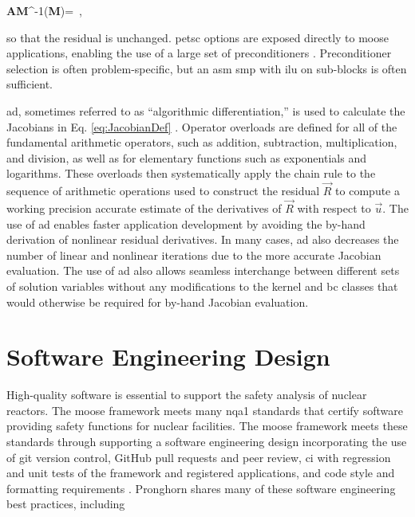 \beq
\textbf{A}\textbf{M}^{-1}(\textbf{M})=\ ,
\eeq

\noindent so that the residual is unchanged. \gls{petsc} options are exposed directly to \gls{moose} applications, enabling the use of a large set of preconditioners \cite{petsc}. Preconditioner selection is often problem-specific, but an \gls{asm} \gls{smp} with \gls{ilu} on sub-blocks is often sufficient.

\gls{ad}, sometimes referred to as ``algorithmic differentiation,'' is used to calculate the Jacobians in Eq. \eqref{eq:JacobianDef} \cite{ad}. Operator overloads are defined for all of the fundamental arithmetic operators, such as addition, subtraction, multiplication, and division, as well as for elementary functions such as exponentials and logarithms. These overloads then systematically apply the chain rule to the sequence of arithmetic operations used to construct the residual \(\vec{R}\) to compute a working precision accurate estimate of the derivatives of \(\vec{R}\) with respect to \(\vec{u}\). The use of \gls{ad} enables faster application development by avoiding the by-hand derivation of nonlinear residual derivatives. In many cases, \gls{ad} also decreases the number of linear and nonlinear iterations due to the more accurate Jacobian evaluation. The use of \gls{ad} also allows seamless interchange between different sets of solution variables without any modifications to the kernel and \gls{bc} classes that would otherwise be required for by-hand Jacobian evaluation.

\section{Software Engineering Design}
\label{sec:software}

High-quality software is essential to support the safety analysis of nuclear reactors. The \gls{moose} framework meets many \gls{nqa1} standards that certify software providing safety functions for nuclear facilities. The \gls{moose} framework meets these standards through supporting a software engineering design incorporating the use of git version control, GitHub pull requests and peer review, \gls{ci} with regression and unit tests of the framework and registered applications, and code style and formatting requirements \cite{slaughter}. Pronghorn shares many of these software engineering best practices, including\mdash

